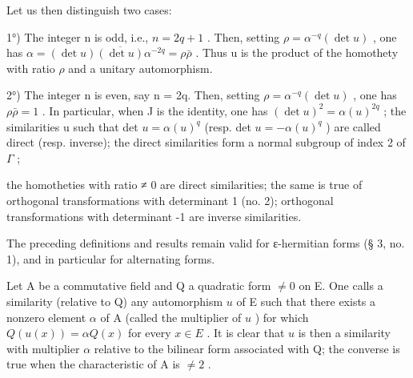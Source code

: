 Let us then distinguish two cases:

1°) The integer n is odd, i.e., \(n = 2q + 1\) . Then, setting \(\rho = \alpha^{-q}(\det u)\) , one has \(\alpha = (\det u) \overline{(\det u)} \alpha^{-2q} = \rho \bar{\rho}\) . Thus u is the product of the homothety with ratio \(\rho\) and a unitary automorphism.

2°) The integer n is even, say n = 2q. Then, setting \(\rho = \alpha^{-q}(\det u)\) , one has \(\rho\bar{\rho} = 1\) . In particular, when J is the identity, one has \((\det u)^{2} = \alpha(u)^{2q}\) ; the similarities u such that det \(u = \alpha(u)^{q}\) (resp. det \(u = -\alpha(u)^{q}\) ) are called direct (resp. inverse); the direct similarities form a normal subgroup of index 2 of \(\Gamma\) ;

the homotheties with ratio ≠ 0 are direct similarities; the same is true of orthogonal transformations with determinant 1 (no. 2); orthogonal transformations with determinant -1 are inverse similarities.

The preceding definitions and results remain valid for ε-hermitian forms (§ 3, no. 1), and in particular for alternating forms.

Let A be a commutative field and Q a quadratic form \(\neq 0\) on E. One calls a similarity (relative to Q) any automorphism \(u\) of E such that there exists a nonzero element \(\alpha\) of A (called the multiplier of \(u\) ) for which \(Q(u(x)) = \alpha Q(x)\) for every \(x \in E\) . It is clear that \(u\) is then a similarity with multiplier \(\alpha\) relative to the bilinear form associated with Q; the converse is true when the characteristic of A is \(\neq 2\) .
\relax{}
